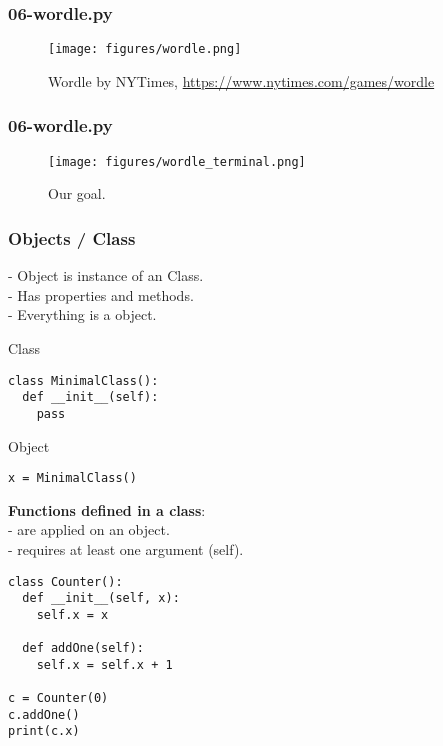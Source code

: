 \documentclass{beamer}
\begin{document}
\begin{frame}[fragile]
    \frametitle{06-wordle.py}
    \begin{figure}
        \texttt{[image: figures/wordle.png]}
        \caption{Wordle by NYTimes, \url{https://www.nytimes.com/games/wordle}}
    \end{figure}
\end{frame}

\begin{frame}[fragile]
    \frametitle{06-wordle.py}
    \begin{figure}
        \texttt{[image: figures/wordle\_terminal.png]}
        \caption{Our goal.}
    \end{figure}
\end{frame}

\begin{frame}[fragile]
    \frametitle{Objects / Class}
    - Object is instance of an Class.\\
    - Has properties and methods. \\
    - Everything is a object.\\
\begin{block}{Class}

    \begin{verbatim}
class MinimalClass():
  def __init__(self):
    pass
    \end{verbatim}
\end{block}
\begin{block}{Object}
\begin{verbatim}
x = MinimalClass()
\end{verbatim}
\end{block}
\end{frame}

\begin{frame}[fragile]
\textbf{Functions defined in a class}:\\
- are applied on an object.\\
- requires at least one argument (self).

\begin{example}
 \begin{verbatim}
class Counter():
  def __init__(self, x):
    self.x = x

  def addOne(self):
    self.x = self.x + 1

c = Counter(0)
c.addOne()
print(c.x)
\end{verbatim}
\end{example}
\end{frame}
\end{document}
